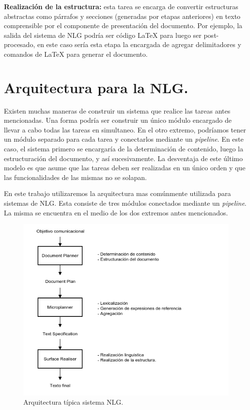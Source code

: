 \bigskip
\noindent
\textbf{Realización de la estructura:} esta tarea se encarga de convertir estructuras abstractas como párrafos y secciones (generadas por etapas anteriores) en texto comprensible por el componente de presentación del documento. Por ejemplo, la salida del sistema de NLG podría ser código LaTeX para luego ser post-procesado, en este caso sería esta etapa la encargada de agregar delimitadores y comandos de LaTeX para generar el documento. 

\section{Arquitectura para la NLG.}
Existen muchas maneras de construir un sistema que realice las tareas antes mencionadas. Una forma podría ser construir un único módulo encargado de llevar a cabo todas las tareas en simultaneo. En el otro extremo, podríamos tener un módulo separado para cada tarea y conectarlos mediante un \emph{pipeline}. En este caso, el sistema primero se encargaría de la determinación de contenido, luego la estructuración del documento, y así sucesivamente. La desventaja de este último modelo es que asume que las tareas deben ser realizadas en un único orden y que las funcionalidades de las mismas no se solapan.

En este trabajo utilizaremos la arquitectura mas comúnmente utilizada para sistemas de NLG. Esta consiste de tres módulos conectados mediante un \emph{pipeline}. La misma se encuentra en el medio de los dos extremos antes mencionados.

\begin{figure}[h]
  	\centering
	\includegraphics{img/arquitectura.png}
	\caption{Arquitectura típica sistema NLG.}
  	\label{fig:png_arquitectura}
\end{figure}

